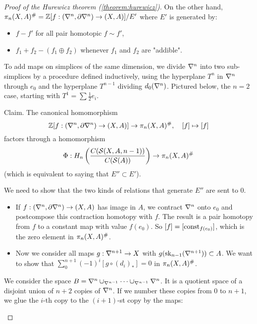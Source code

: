 \begin{proof}[Proof of the Hurewicz theorem (\ref{theorem:hurewicz})]
On the other hand, $\pi_n(X,A)^\#={\mathbb Z}[f:(\nabla^n,\partial\nabla^n)\to(X,A)]/E'$
where $E'$ is generated by:
\begin{itemize}[label={-}]
    \item $f-f'$ for all pair homotopic $f\sim f'$,
    \item $f_1+f_2-(f_1\oplus f_2)$ whenever $f_1$ and $f_2$ are "addible".
\end{itemize}

To add maps on simplices of the same dimension, we divide $\nabla^n$ into two sub-simplices by a procedure defined inductively, using the hyperplane $T^n$ in $\nabla^n$ through $e_0$ and the hyperplane $T^{n-1}$ dividing $d_0(\nabla^{n})$. Pictured below, the $n=2$ case, starting with $T^1=\sum \frac{1}{2} e_i$.


Claim. The canonical homomorphism
\[{\mathbb Z}[f:(\nabla^n,\partial\nabla^n)\to(X,A)]\to \pi_n(X,A)^\#,\quad [f]\mapsto[f]\]
factors through a homomorphism
\[\Phi: H_n\left(\frac{C(\mathcal{S}(X,A,n-1))}{C(\mathcal{S}(A))}\right)\to\pi_n(X,A)^\#\]
(which is equivalent to saying that $E''\subset E'$).

\begin{claimproof}
We need to show that the two kinds of relations that generate $E''$ are sent to $0$.
\begin{itemize}[label={-}]
    \item If $f:(\nabla^n,\partial\nabla^n)\to(X,A)$ has image in $A$, we contract $\nabla^n$ onto $e_0$ and postcompose this contraction homotopy with $f$. The result is a pair homotopy from $f$ to a constant map with value $f(e_0)$. So $[f]=[\operatorname{const}_{f(e_0)}]$, which is the zero element in $\pi_n(X,A)^\#$.
    \item Now we consider all maps $g:\nabla^{n+1}\to X$ with $g(\operatorname{sk}_{n-1}(\nabla^{n+1}))\subset A$. We want to show that $\sum_0^{n+1}(-1)^i [g\circ(d_i)_*]=0$ in $\pi_n(X,A)^\#$.
\end{itemize}

We consider the space $B=\nabla^{n}\cup_{\nabla^{n-1}}\dots\cup_{\nabla^{n-1}}\nabla^{n}$. It is a quotient space of a disjoint union of $n+2$ copies of $\nabla^n$. If we number these copies from $0$ to $n+1$, we glue the $i$-th copy to the $(i+1)$-st copy by the maps:
\begin{center}
\end{center}


\end{claimproof}
\end{proof}
